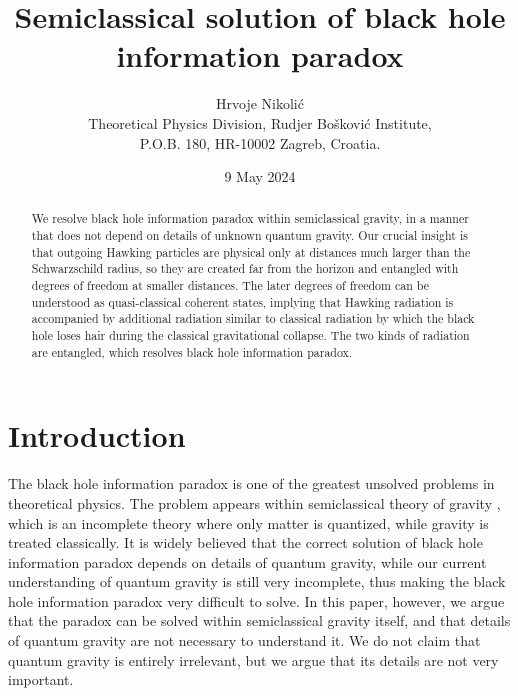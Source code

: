 \documentclass[12pt]{article}
\begin{document}
\title{Semiclassical solution of black hole information paradox}

\author{Hrvoje Nikoli\'c \\
Theoretical Physics Division, Rudjer Bo\v{s}kovi\'{c} Institute,\\
P.O.B. 180, HR-10002 Zagreb, Croatia.}

\date{9 May 2024}



\maketitle

\begin{abstract}
We resolve black hole information paradox within semiclassical gravity, in a manner that does not depend on 
details of unknown quantum gravity. Our crucial insight is that outgoing Hawking particles are physical only 
at distances much larger than the Schwarzschild radius, so they are created far from the horizon and entangled 
with degrees of freedom at smaller distances. The later degrees of freedom can be understood as 
quasi-classical coherent states, implying that Hawking radiation is accompanied by additional 
radiation similar to classical radiation by which the black hole loses hair during the classical gravitational 
collapse. The two kinds of radiation are entangled, which resolves black hole information paradox. 
\end{abstract}

\section{Introduction}

The black hole information paradox 
\cite{gid,math1,math2,hoss,dundar,harlow,polchinski,chakra,marolf,fabbri}
is one of the greatest unsolved problems in theoretical physics. 
The problem appears within semiclassical theory of gravity 
\cite{bd,mukhanov}, which is an incomplete theory 
where only matter is quantized, while gravity is treated classically.
It is widely believed that the correct solution of black hole information paradox
depends on details of quantum gravity, while our current understanding of 
quantum gravity is still very incomplete, thus making the black hole information paradox 
very difficult to solve. In this paper, however, we argue that the paradox can be solved 
within semiclassical gravity itself, and that details of quantum gravity are not necessary
to understand it. We do not claim that quantum gravity is entirely irrelevant, 
but we argue that its details are not very important.  
\end{document}

